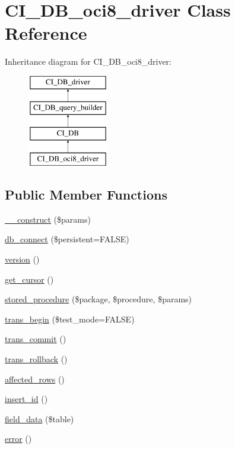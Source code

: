 \hypertarget{class_c_i___d_b__oci8__driver}{}\section{C\+I\+\_\+\+D\+B\+\_\+oci8\+\_\+driver Class Reference}
\label{class_c_i___d_b__oci8__driver}
Inheritance diagram for C\+I\+\_\+\+D\+B\+\_\+oci8\+\_\+driver\+:\begin{figure}[H]
\begin{center}
\leavevmode
\includegraphics[height=4.000000cm]{class_c_i___d_b__oci8__driver}
\end{center}
\end{figure}
\subsection*{Public Member Functions}
\begin{DoxyCompactItemize}
\item 
\hyperlink{class_c_i___d_b__oci8__driver_a9162320adff1a1a4afd7f2372f753a3e}{\+\_\+\+\_\+construct} (\$params)
\item 
\hyperlink{class_c_i___d_b__oci8__driver_a52bf595e79e96cc0a7c907a9b45aeb4d}{db\+\_\+connect} (\$persistent=F\+A\+L\+S\+E)
\item 
\hyperlink{class_c_i___d_b__oci8__driver_a6080dae0886626b9a4cedb29240708b1}{version} ()
\item 
\hyperlink{class_c_i___d_b__oci8__driver_aaf8b241dc9ed2d812e965dc882ed9ea3}{get\+\_\+cursor} ()
\item 
\hyperlink{class_c_i___d_b__oci8__driver_a39bf84e2ee9cbd2d0e8c2d12ea72a292}{stored\+\_\+procedure} (\$package, \$procedure, \$params)
\item 
\hyperlink{class_c_i___d_b__oci8__driver_a90e153cf190d273336d77cce930587e1}{trans\+\_\+begin} (\$test\+\_\+mode=F\+A\+L\+S\+E)
\item 
\hyperlink{class_c_i___d_b__oci8__driver_af4fbdcdace4aa94a139b64877601fe9b}{trans\+\_\+commit} ()
\item 
\hyperlink{class_c_i___d_b__oci8__driver_a53f76d4dfcd6ac04fb653982442aeef8}{trans\+\_\+rollback} ()
\item 
\hyperlink{class_c_i___d_b__oci8__driver_a77248aaad33eb132c04cc4aa3f4bc8cb}{affected\+\_\+rows} ()
\item 
\hyperlink{class_c_i___d_b__oci8__driver_a933f2cde8dc7f87875e257d0a4902e99}{insert\+\_\+id} ()
\item 
\hyperlink{class_c_i___d_b__oci8__driver_a90355121e1ed009e0efdbd544ab56efa}{field\+\_\+data} (\$table)
\item 
\hyperlink{class_c_i___d_b__oci8__driver_a43b8d30b879d4f09ceb059b02af2bc02}{error} ()
\end{DoxyCompactItemize}
